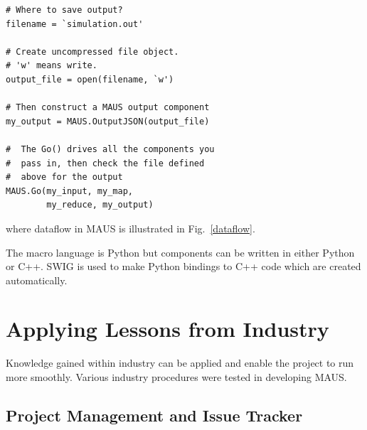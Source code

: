 \documentclass{JAC2003}
\begin{document}
\begin{verbatim}
# Where to save output?                                                                                                                                                                      
filename = `simulation.out'

# Create uncompressed file object.                                                                                                                                                           
# 'w' means write.                                                                                                                                                                           
output_file = open(filename, `w')

# Then construct a MAUS output component                                                                                                                                                     
my_output = MAUS.OutputJSON(output_file)

#  The Go() drives all the components you                                                                                                                                                    
#  pass in, then check the file defined                                                                                                                                                      
#  above for the output                                                                                                                                                                      
MAUS.Go(my_input, my_map,
        my_reduce, my_output)
\end{verbatim}

\noindent
where dataflow in MAUS is illustrated in Fig.~\ref{dataflow}.

The macro language is Python but components can be written in either Python or C++.  SWIG \cite{swig} is used to make Python bindings to C++ code which are created automatically.

\section{Applying Lessons from Industry}

Knowledge gained within industry can be applied and enable the project to run more smoothly.   Various industry procedures were tested in developing MAUS.

\subsection{Project Management and Issue Tracker}
\end{document}
